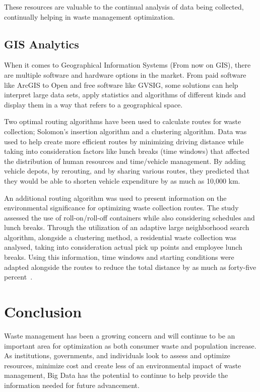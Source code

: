 These resources are valuable to the continual analysis of data being 
collected, continually helping in waste management optimization.

\subsection{GIS Analytics}

When it comes to Geographical Information Systems (From now on GIS), 
there are multiple software and hardware options in the market. From 
paid software like ArcGIS to Open and free software like GVSIG, some 
solutions can help interpret large data sets, apply statistics and 
algorithms of different kinds and display them in a way that refers 
to a geographical space. 

Two optimal routing algorithms have been used to calculate routes for 
waste collection; Solomon's insertion algorithm and a clustering algorithm.  
Data was used to help create more efficient routes by minimizing driving 
distance while taking into consideration factors like lunch breaks
 (time windows) that affected the distribution of human resources and 
time/vehicle management. By adding vehicle depots, by rerouting, 
and by sharing various routes, they predicted that they would be able 
to shorten vehicle expenditure by as much as 10,000 km.  

An additional routing algorithm was used to present information on 
the environmental significance for optimizing waste collection routes. 
The study assessed the use of roll-on/roll-off containers while also 
considering schedules and lunch breaks.  Through the utilization of an 
adaptive large neighborhood search algorithm, alongside a clustering method, 
a residential waste collection was analysed, taking into consideration 
actual pick up points and employee lunch breaks.  Using this information, 
time windows and starting conditions were adapted alongside the routes to 
reduce the total distance by as much as forty-five 
percent~\cite{shahrokni2014big}.

\section{Conclusion}
Waste management has been a growing concern and will continue to be an 
important area for optimization as both consumer waste and population 
increase. As institutions, governments, and individuals look to assess 
and optimize resources, minimize cost and create less of an environmental 
impact of waste management, Big Data has the potential to continue to help 
provide the information needed for future advancement.

